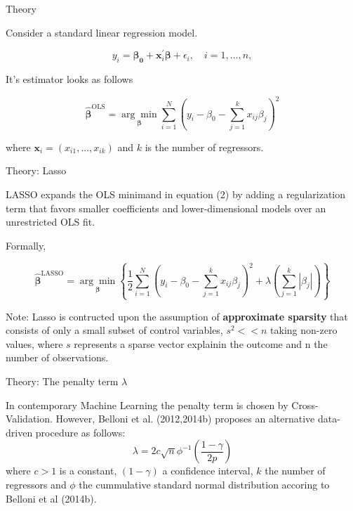 \documentclass[serif,professionalfont]{beamer}
\begin{document}
\begin{frame}{Theory}
\begin{flushleft}
\item Consider a standard linear regression model. 
\end{flushleft}
\[
    y_i=\boldsymbol{\beta_0} +\mathbf{x}_i^\prime \boldsymbol{\beta}+\epsilon_i, \quad i = 1, \ldots, n,
    \tag{1}
\]
\begin{flushleft}
It's estimator looks as follows
\end{flushleft}
\[
\hat{\boldsymbol{\beta}}^{\text{OLS}}=\underset{\boldsymbol{\beta}}{\arg \min}\sum_{i=1}^N (y_i-\beta_0-\sum_{j=1}^k x_{i j}\beta_j)^2
    \tag{2}
\]
\begin{flushleft}
where $\mathbf{x}_i=(x_{i1}, ..., x_{ik})$ and $k$ is the number of regressors.
\end{flushleft}
\end{frame}


\begin{frame}{Theory: Lasso}
\begin{flushleft}
LASSO expands the OLS minimand in equation (2) by adding a regularization term  
that favors smaller coefficients and lower-dimensional models over an unrestricted OLS fit.

Formally, 
\end{flushleft}
	\[
	\hat{\boldsymbol{\beta}}^{\text{LASSO}} =\underset{\boldsymbol{\beta}}{\arg \min}\left\{\frac{1}{2}\sum_{i=1}^N (y_i-\beta_0-\sum_{j=1}^k x_{i j}\beta_j)^2 +\lambda \left(\sum_{j=1}^k |\beta_j|\right)\right\}
	\tag{3}
	\]

\begin{flushleft}
Note: Lasso is contructed upon the assumption of \textbf{approximate sparsity} that consists of only a small subset of control variables, $s^2<<n$ taking non-zero values, where $s$ represents
a sparse vector explainin the outcome and n the number of observations.
\end{flushleft}
\end{frame}


\begin{frame}{Theory: The penalty term $\lambda$}
	\begin{flushleft}
	In contemporary Machine Learning the penalty term is chosen by Cross-Validation. However, 
	Belloni et al. (2012,2014b) proposes an alternative data-driven procedure as follows:
	\[
	\lambda=2c \sqrt{n} \phi^{-1} (\frac{1-\gamma}{2p})
		\tag{4}
	\]
	where $c>1$ is a constant, $(1-\gamma)$ a confidence interval, $k$ the number of regressors and $\phi$ the cummulative standard normal distribution
	accoring to Belloni et al (2014b).
	\end{flushleft}
\end{frame}
\end{document}
